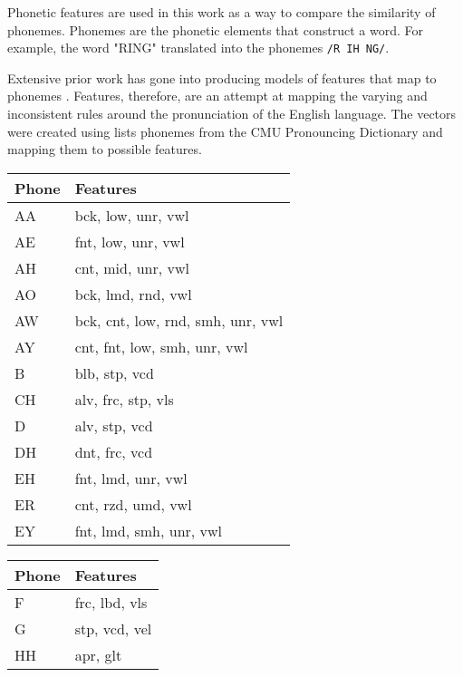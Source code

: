 Phonetic features are used in this work as a way to compare the similarity of phonemes. Phonemes are the phonetic elements that construct a word. For example, the word "RING" translated into the phonemes \verb|/R IH NG/|. 

Extensive prior work has gone into producing models of features that map to phonemes \cite{chomsky1968sound}\cite{ladefoged1969measurement}\cite{bradlow2010perceptual}. Features, therefore, are an attempt at mapping the varying and inconsistent rules around the pronunciation of the English language. The vectors were created using lists phonemes from the CMU Pronouncing Dictionary and mapping them to possible features.

\begin{table}[!htb]
    \tiny
    \begin{minipage}{.33\linewidth}
        \centering
        \begin{tabular}{ll}
            Phone & Features \\
            \hline
            AA & bck, low, unr, vwl \\
            AE & fnt, low, unr, vwl \\
            AH & cnt, mid, unr, vwl \\
            AO & bck, lmd, rnd, vwl \\
            AW & bck, cnt, low, rnd, smh, unr, vwl \\
            AY & cnt, fnt, low, smh, unr, vwl \\
            B & blb, stp, vcd \\
            CH & alv, frc, stp, vls \\
            D & alv, stp, vcd \\
            DH & dnt, frc, vcd \\
            EH & fnt, lmd, unr, vwl \\
            ER & cnt, rzd, umd, vwl \\
            EY & fnt, lmd, smh, unr, vwl
        \end{tabular}
    \end{minipage}%
    \begin{minipage}{.33\linewidth}
        \centering
        \begin{tabular}{ll}
            Phone & Features \\
            \hline
            F &  frc, lbd, vls \\
            G &  stp, vcd, vel \\
            HH & apr, glt \\

\end{tabular}
\end{minipage}
\end{table}
